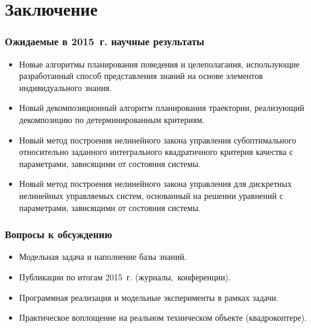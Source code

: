 \documentclass[default]{beamer}
\begin{document}
	\section{Заключение}
	
	\begin{frame}
		\frametitle{Ожидаемые в 2015~г. научные результаты}
		
		\begin{itemize}
			\item Новые алгоритмы планирования поведения и целеполагания, использующие разработанный способ представления знаний на основе элементов индивидуального знания.
			\item Новый декомпозиционный алгоритм планирования траектории, реализующий декомпозицию по детерминированным критериям.
			\item Новый метод построения нелинейного закона управления субоптимального относительно заданного интегрального квадратичного критерия качества с параметрами, зависящими от состояния системы.  
			\item Новый метод построения нелинейного закона управления для дискретных нелинейных управляемых систем, основанный на решении уравнений с параметрами, зависящими от состояния системы. 
		\end{itemize}

	\end{frame}
	
	\begin{frame}
		\frametitle{Вопросы к обсуждению}
		
		\begin{itemize}
			\item Модельная задача и наполнение базы знаний.
			\item Публикации по итогам 2015~г. (журналы,~конференции).
			\item Программная реализация и модельные эксперименты в рамках задачи.
			\item Практическое воплощение на реальном техническом объекте (квадрокоптере).
		\end{itemize}
	\end{frame}
\end{document}
